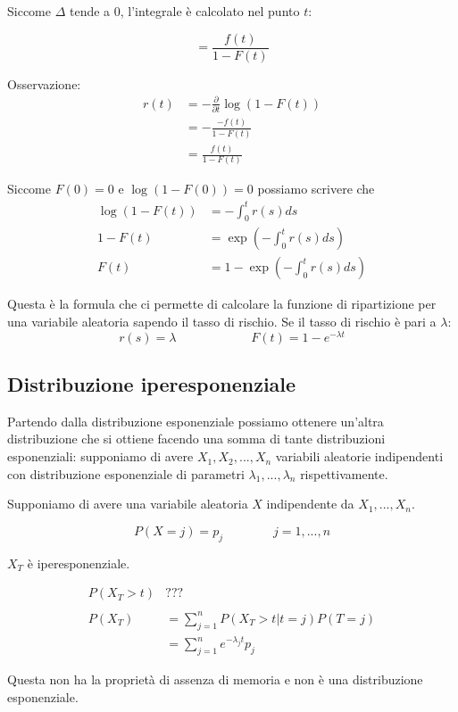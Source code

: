 \documentclass[a4paper,12pt]{book}
\begin{document}
Siccome $\Delta$ tende a 0, l'integrale è calcolato nel punto $ t $:

$$ = \frac{f(t)}{1 - F(t)} $$

Osservazione:
\begin{align*}
	r(t) & = -\frac{\partial}{\partial t} \log (1 - F(t)) \\
	& = - \frac{-f(t)}{1 - F(t)} \\
	& = \frac{f(t)}{1 - F(t)}
\end{align*}

Siccome $ F(0) = 0 $ e $ \log(1 - F(0)) = 0 $ possiamo scrivere che 
\begin{align*}
	\log(1 - F(t)) & = -\int_{0}^{t} r(s) ds \\
	1 - F(t) & = \exp \left( - \int_{0}^{t} r(s)ds \right) \\
	F(t) & = 1 - \exp \left( - \int_{0}^{t} r(s)ds \right)
\end{align*}

Questa è la formula che ci permette di calcolare la funzione di ripartizione per una variabile aleatoria sapendo il tasso di rischio. Se il tasso di rischio è pari a $\lambda$:
$$ r(s) = \lambda \qquad \qquad \qquad F(t) = 1 - e^{-\lambda t}$$ 

\subsection{Distribuzione iperesponenziale}

Partendo dalla distribuzione esponenziale possiamo ottenere un'altra distribuzione che si ottiene facendo una somma di tante distribuzioni esponenziali: supponiamo di avere $ X_1, X_2, ..., X_n $ variabili aleatorie indipendenti con distribuzione esponenziale di parametri $ \lambda_1, ..., \lambda_n $ rispettivamente. 

Supponiamo di avere una variabile aleatoria $ X $ indipendente da $ X_1, ..., X_n $.

$$ P(X = j) = p_j \qquad \qquad j = 1, ..., n $$

$ X_T $ è iperesponenziale.

\begin{align*}
	P(X_T > t) & ??? \\ %
	\\
	P(X_T) & = \sum_{j=1}^{n} P(X_T > t | t = j) P (T = j) \\
	& = \sum_{j = 1}^{n} e ^{-\lambda_j t} p_j
\end{align*}

Questa non ha la proprietà di assenza di memoria e non è una distribuzione esponenziale. 
\end{document}
